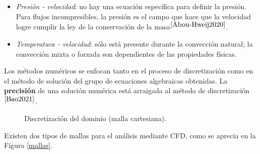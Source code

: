 \begin{itemize}
	\item \textit{Presi\'on - velocidad}: no hay una ecuaci\'on espec\'ifica para definir la presi\'on. Para flujos incompresibles, la presi\'on es el campo que hace que la velocidad logre cumplir la ley de la conservaci\'on de la masa$^{\cite{Abou-Hweij2020}}$.
	\item \textit{Temperatura - velocidad}: s\'olo est\'a presente durante la convecci\'on natural; la convecci\'on mixta o forzada son dependientes de las propiedades f\'isicas.
\end{itemize}

\noindent
\justify

Los m\'etodos num\'ericos se enfocan tanto en el proceso de discretizaci\'on como en el m\'etodo de soluci\'on del grupo de ecuaciones algebraicas obtenidas. La \textbf{precisi\'on} de una soluci\'on num\'erica est\'a arraigada al m\'etodo de discretizaci\'on$^{\cite{Bao2021}}$.

\begin{figure}[h!]
	\centering
	\caption{Discretizaci\'on del dominio (malla cartesiana).}
	\label{elemento}
\end{figure}

\newpage

\noindent
\justify

Existen dos tipos de mallas para el an\'alisis mediante CFD, como se aprecia en la Figura \ref{mallas}.

